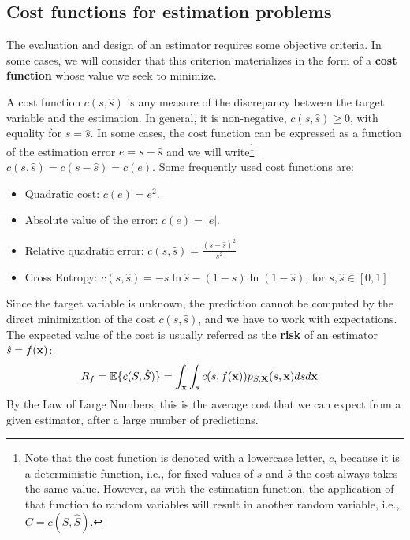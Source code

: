 \subsection{Cost functions for estimation problems}
\label{subsec_funcion_coste}

The evaluation and design of an estimator requires some objective criteria. In some cases, we will consider that this criterion materializes in the form of a {\bf cost function} whose value we seek to minimize. %

A cost function $c(s,\hat s)$ is any measure of the discrepancy between the target variable and the estimation. In general, it is non-negative, $c(s,\hat s) \geq 0$, with equality for $s = \hat s$. In some cases, the cost function can be expressed as a function of the estimation error $e= s-\hat s$ and we will write\footnote{Note that the cost function is denoted with a lowercase letter, $c$, because it is a deterministic function, i.e., for fixed values of $s$ and $\hat s$ the cost always takes the same value. However, as with the estimation function, the application of that function to random variables will result in another random variable, i.e., $C = c(S,\hat S)$.} $c(s,\hat s) = c(s - \hat s) = c(e)$. Some frequently used cost functions are:
\begin{itemize}
\item Quadratic cost: $c(e) = e^2$.
\item Absolute value of the error: $c(e) = |e|$.
\item Relative quadratic error: $c(s,\hat s) = \frac{(s-\hat{s})^2}{s^2}$
\item Cross Entropy: $c(s,\hat s) = - s \ln \hat s - (1-s) \ln (1-\hat s)$, for $s,\hat{s}\in [0,1]$
\end{itemize}

Since the target variable is unknown, the prediction cannot be computed by the direct minimization of the cost $c(s, \hat s)$, and we have to work with expectations. The expected value of the cost is usually referred as the {\bf risk} of an estimator $\hat{s}=f({\bf x})$:
\begin{align}
\label{Est:coste_medio_gen}
R_f = \mathbb{E}\{c(S,\hat S)\} 
    & = \int_{\bf x} \int_s c(s,f({\bf x})) p_{S,{\bf X}}(s,{\bf x}) ds d{\bf x}
\end{align}
By the Law of Large Numbers, this is the average cost that we can expect from a given estimator, after a large number of predictions.

